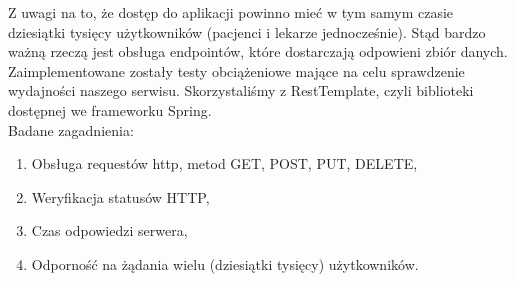 Z uwagi na to, że dostęp do aplikacji powinno mieć w tym samym czasie dziesiątki tysięcy użytkowników (pacjenci i lekarze jednocześnie).
Stąd bardzo ważną rzeczą jest obsługa endpointów, które dostarczają odpowieni zbiór danych.\\
Zaimplementowane zostały testy obciążeniowe mające na celu sprawdzenie wydajności naszego serwisu.
Skorzystaliśmy z RestTemplate, czyli biblioteki dostępnej we frameworku Spring.\\
Badane zagadnienia:
\begin{enumerate}
\item Obsługa requestów http, metod GET, POST, PUT, DELETE,
\item Weryfikacja statusów HTTP,
\item Czas odpowiedzi serwera,
\item Odporność na żądania wielu (dziesiątki tysięcy) użytkowników.
\end{enumerate}
